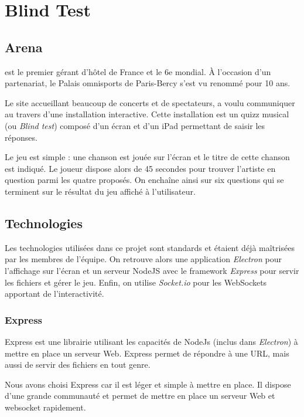 \section{Blind Test \aha}

\subsection{\ah Arena}

\ah est le premier gérant d'hôtel de France et le 6e mondial.
À l'occasion d'un partenariat, le Palais omnisports de Paris-Bercy s'est vu renommé \aha pour 10 ans.

Le site accueillant beaucoup de concerts et de spectateurs, \ah a voulu communiquer au travers d'une installation interactive.
Cette installation est un quizz musical (ou \emph{Blind test}) composé d'un écran et d'un iPad permettant de saisir les réponses.

Le jeu est simple : une chanson est jouée sur l'écran et le titre de cette chanson est indiqué.
Le joueur dispose alors de 45 secondes pour trouver l'artiste en question parmi les quatre proposés.
On enchaîne ainsi sur six questions qui se terminent sur le résultat du jeu affiché à l'utilisateur.

\subsection{Technologies}

Les technologies utilisées dans ce projet sont standards et étaient déjà maîtrisées par les membres de l'équipe.
On retrouve alors une application \emph{Electron} pour l'affichage sur l'écran et un serveur NodeJS avec le framework \emph{Express} pour servir les fichiers et gérer le jeu.
Enfin, on utilise \emph{Socket.io} pour les WebSockets apportant de l'interactivité.

\subsubsection{Express}

Express est une librairie utilisant les capacités de NodeJs (inclus dans \emph{Electron}) à mettre en place un serveur Web.
Express permet de répondre à une URL, mais aussi de servir des fichiers en tout genre.

Nous avons choisi Express car il est léger et simple à mettre en place.
Il dispose d'une grande communauté et permet de mettre en place un serveur Web et websocket rapidement.

